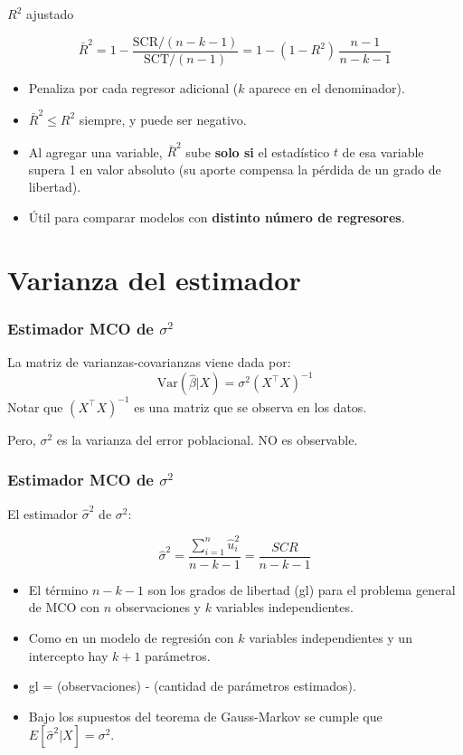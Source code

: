 \documentclass{beamer}
\begin{document}
\begin{frame}{$R^2$ ajustado}

\begin{tcolorbox}[colback=blue!5!white, colframe=blue!75!black, title=$R^2$ ajustado]
\[
\bar{R}^2 = 1 - \frac{\text{SCR}/(n-k-1)}{\text{SCT}/(n-1)}
          = 1 - (1-R^2)\,\frac{n-1}{n-k-1}
\]
\end{tcolorbox}

\begin{itemize}
    \item Penaliza por cada regresor adicional ($k$ aparece en el denominador).
    \item $\bar{R}^2 \le R^2$ siempre, y puede ser \alert{negativo}.
    \item Al agregar una variable, $\bar{R}^2$ sube \textbf{solo si} el estadístico $t$ de esa variable supera 1 en valor absoluto (su aporte compensa la pérdida de un grado de libertad).
    \item Útil para comparar modelos con \textbf{distinto número de regresores}.
\end{itemize}
\end{frame}

\section{Varianza del estimador}

\begin{frame}
\frametitle{Estimador MCO de $\sigma^2$}
La matriz de varianzas-covarianzas viene dada por:
\[
\text{Var}(\hat{\beta}|X) = \sigma^2(X^{\top}X)^{-1}
\]
Notar que $(X^{\top}X)^{-1}$ es una matriz que se observa en los datos.

Pero, $\sigma^2$ es la varianza del error poblacional. NO es observable.

\end{frame}

\begin{frame}
\frametitle{Estimador MCO de $\sigma^2$}

El estimador $\hat{\sigma}^2$ de $\sigma^2$:

 $$\hat{\sigma}^2 = \frac{\sum_{i=1}^{n} \hat{u}_i^2 }{n-k-1}= \frac{SCR}{n - k - 1}$$


\begin{itemize}
    \item  El término $n - k - 1$ son los grados de libertad (gl) para el problema general de
MCO con $n$ observaciones y $k$ variables independientes.
\item  Como en un modelo de regresión con $k$ variables independientes y un intercepto hay $k + 1$ parámetros.
\item gl =  (observaciones) - (cantidad de parámetros estimados).
\item  Bajo los supuestos del teorema de Gauss-Markov se cumple que $E[\hat{\sigma}^2|X] = \sigma^2$.
\end{itemize}

\end{frame}
\end{document}
